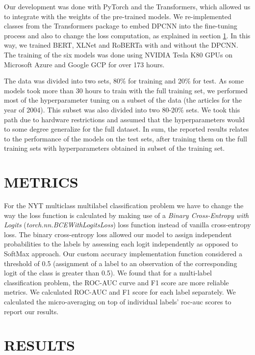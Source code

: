 \documentclass{article}
\begin{document}
Our development was done with PyTorch and the Transformers\cite{huggingface_ref}, which allowed us to integrate with the weights of the pre-trained models. We re-implemented classes from the Transformers package to embed DPCNN into the fine-tuning process and also to change the loss computation, as explained in section \ref{metrics_section}. In this way, we trained BERT, XLNet and RoBERTa with and without the DPCNN. The training of the six models was done using NVIDIA Tesla K80 GPUs on Microsoft Azure and Google GCP for over 173 hours.

The data was divided into two sets, 80\% for training and 20\% for test. As some models took more than 30 hours to train with the full training set, we performed most of the hyperparameter tuning on a subset of the data (the articles for the year of 2004). This subset was also divided into two 80-20\% sets. We took this path due to hardware restrictions and assumed that the hyperparameters would to some degree generalize for the full dataset. In sum, the reported results relates to the performance of the models on the test sets, after training them on the full training sets with hyperparameters obtained in subset of the training set.


\section{METRICS} \label{metrics_section}

For the NYT multiclass multilabel classification problem we have to change the way the loss function is calculated by making use of a \textit{Binary Cross-Entropy with Logits} (\textit{torch.nn.BCEWithLogitsLoss}) loss function instead of vanilla cross-entropy loss. The binary cross-entropy loss allowed our model to assign independent probabilities to the labels by assessing each logit independently as opposed to SoftMax approach. Our custom accuracy implementation function considered a threshold of 0.5 (assignment of a label to an observation of the corresponding logit of the class is greater than 0.5).
We found that for a multi-label classification problem, the ROC-AUC curve and F1 score are more reliable metrics. We calculated ROC-AUC and F1 score for each label separately. We calculated the micro-averaging on top of individual labels’ roc-auc scores to report our results.

\section{RESULTS} \label{result_section}
\end{document}
